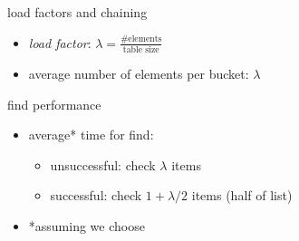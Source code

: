 
\begin{frame}{load factors and chaining}
\begin{itemize}
\item \textit{load factor}: $\lambda = \frac{\text{\# elements}}{\text{table size}}$
\item average number of elements per bucket: $\lambda$
\end{itemize}
\end{frame}

\begin{frame}{find performance}
\begin{itemize}
\item average* time for find: 
    \begin{itemize}
    \item unsuccessful: check $\lambda$ items
    \item successful: check $1+\lambda/2$ items (half of list)
    \end{itemize}
    \vspace{.5cm}
\item *assuming we choose 
\end{itemize}
\end{frame}


